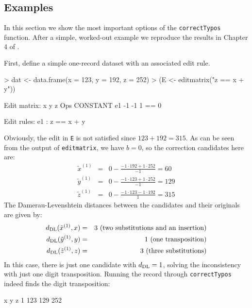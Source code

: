 \documentclass[11pt, fleqn, a4paper]{article}
\begin{document}
\subsection{Examples}
In this section we show the most important options of the {\tt correctTypos}
function.  After a simple, worked-out example we reproduce the results in
Chapter 4 of \cite{scholtus:2009}.

First, define a simple one-record dataset with an associated edit rule.
\begin{Schunk}
\begin{Sinput}
> dat <- data.frame(x = 123, y = 192, z = 252)
> (E <- editmatrix("z == x + y"))
\end{Sinput}
\begin{Soutput}
Edit matrix:
    x  y z Ops CONSTANT
e1 -1 -1 1  ==        0

Edit rules:
e1 : z == x + y  
\end{Soutput}
\end{Schunk}
Obviously, the edit in {\tt E} is not satisfied since $123+192=315$. As can be
seen from the output of {\tt editmatrix}, we have $b=0$, so the correction
candidates here are:
\begin{eqnarray}
\tilde{x}^{(1)} &=& 0 - \frac{-1\cdot 192+1\cdot252}{-1} = 60\\
\tilde{y}^{(1)} &=& 0 - \frac{-1\cdot 123+1\cdot252}{-1} = 129\\
\tilde{z}^{(1)} &=& 0 - \frac{-1\cdot 123-1\cdot192}{1} = 315 
\end{eqnarray}
The Damerau-Levenshtein distances between the candidates and their originals
are given by:
\begin{eqnarray}
d_{\rm DL}(\tilde{x}^{(1)},x) &=& 3\textrm{ (two substitutions and an insertion)}\\
d_{\rm DL}(\tilde{y}^{(1)},y) &=& 1\textrm{ (one transposition)}\\
d_{\rm DL}(\tilde{z}^{(1)},z) &=& 3\textrm{ (three substitutions)}
\end{eqnarray}
In this case, there is just one candidate with $d_{\rm DL}=1$, solving the 
inconsistency with just one digit transposition. Running the record through 
{\tt correctTypos} indeed finds the digit transposition:
\begin{Schunk}
\begin{Soutput}
    x   y   z
1 123 129 252
\end{Soutput}
\end{Schunk}
\end{document}
